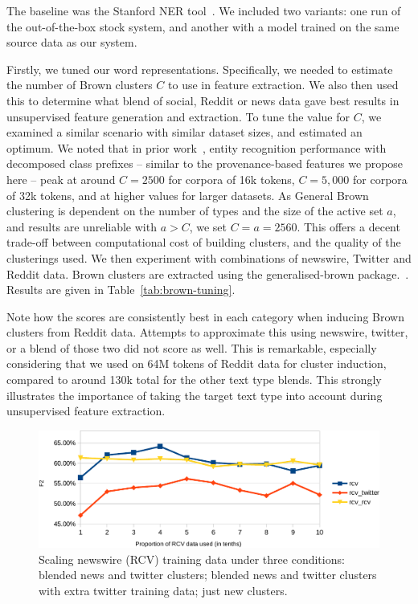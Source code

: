 \documentclass[10pt,journal,compsoc]{IEEEtran}
\begin{document}
The baseline was the Stanford NER tool~\cite{finkel2005incorporating}.
We included two variants: one run of the out-of-the-box stock system, and another with a model trained on the same source data as our system.

Firstly, we tuned our word representations.
Specifically, we needed to estimate the number of Brown clusters $C$ to use in feature extraction.
We also then used this to determine what blend of social, Reddit or news data gave best results in unsupervised feature generation and extraction.
To tune the value for $C$, we examined a similar scenario with similar dataset sizes, and estimated an optimum.
We noted that in prior work~\cite{derczynski2015tune}, entity recognition performance with decomposed class prefixes -- similar to the provenance-based features we propose here -- peak at around $C=2500$ for corpora of 16k tokens, $C=5,000$ for corpora of 32k tokens, and at higher values for larger datasets.
As General Brown clustering is dependent on the number of types and the size of the active set $a$, and results are unreliable with $a>C$, we set $C = a = 2560$.
This offers a decent trade-off between computational cost of building clusters, and the quality of the clusterings used.
We then experiment with combinations of newswire, Twitter and Reddit data.
Brown clusters are extracted using the generalised-brown package.~\cite{sean_chester_2015_33758}.
Results are given in Table~\ref{tab:brown-tuning}.

Note how the scores are consistently best in each category when inducing Brown clusters from Reddit data.
Attempts to approximate this using newswire, twitter, or a blend of those two did not score as well.
This is remarkable, especially considering that we used on 64M tokens of Reddit data for cluster induction, compared to around 130k total for the other text type blends.
This strongly illustrates the importance of taking the target text type into account during unsupervised feature extraction.



\begin{figure}
\centering
\includegraphics[width=0.79\columnwidth]{entity-chunking/chart-results-rcv-crop.pdf}
\caption{Scaling newswire (RCV) training data under three conditions: blended news and twitter clusters; blended news and twitter clusters with extra twitter training data; just new clusters.}
\label{fig:rcv-scaling}
\end{figure}
\end{document}
